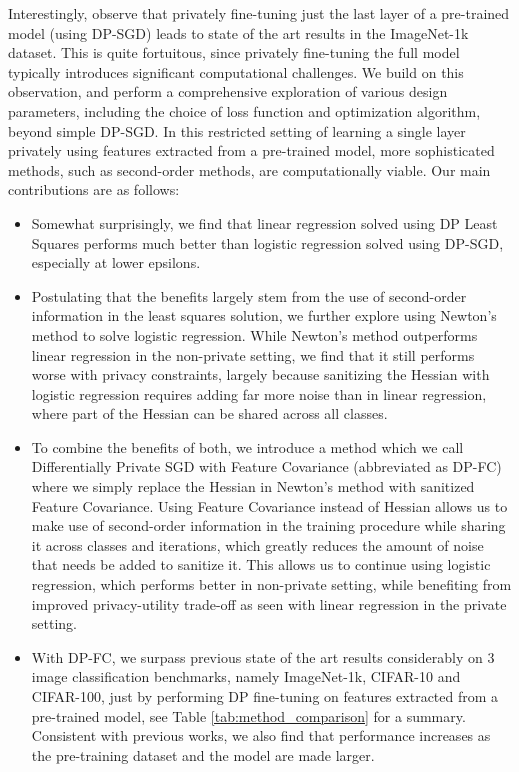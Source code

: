 \documentclass[letterpaper]{article} \usepackage{fullpage}
\begin{document}
Interestingly, \cite{mehta2022large,dm_transfer_2022} observe that privately fine-tuning just the last layer of a pre-trained model (using DP-SGD) leads to state of the art results in the ImageNet-1k dataset. This is quite fortuitous, since privately fine-tuning the full model typically introduces significant computational challenges. We build on this observation, and perform a comprehensive exploration of various design parameters, including the choice of loss function and optimization algorithm, beyond simple DP-SGD. In this restricted setting of learning a single layer privately using features extracted from a pre-trained model, more sophisticated methods, such as second-order methods, are computationally viable. Our main contributions are as follows:

\begin{itemize}
    \item Somewhat surprisingly, we find that linear regression solved using DP Least Squares performs much better than logistic regression solved using DP-SGD, especially at lower epsilons.
    \item Postulating that the benefits largely stem from the use of second-order information in the least squares solution, we further explore using Newton's method to solve logistic regression. While Newton's method outperforms linear regression in the non-private setting, we find that it still performs worse with privacy constraints, largely because sanitizing the Hessian with logistic regression requires adding far more noise than in linear regression, where part of the Hessian can be shared across all classes.
    \item To combine the benefits of both, we introduce a method which we call Differentially Private SGD with Feature Covariance (abbreviated as DP-FC) where we simply replace the Hessian in Newton's method with sanitized Feature Covariance. Using Feature Covariance instead of Hessian allows us to make use of second-order information in the training procedure while sharing it across classes and iterations, which greatly reduces the amount of noise that needs be added to sanitize it. This allows us to continue using logistic regression, which performs better in non-private setting, while benefiting from improved privacy-utility trade-off as seen with linear regression in the private setting.
    \item With DP-FC, we surpass previous state of the art results considerably on 3 image classification benchmarks, namely ImageNet-1k, CIFAR-10 and CIFAR-100, just by performing DP fine-tuning on features extracted from a pre-trained model, see Table \ref{tab:method_comparison} for a summary. Consistent with previous works, we also find that performance increases as the pre-training dataset and the model are made larger.
\end{itemize}
\end{document}
